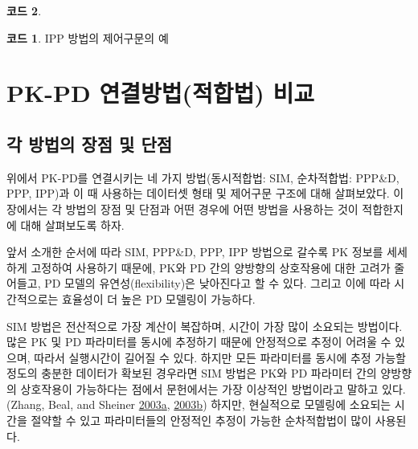 \documentclass[
  10pt,
  krantz2,
  a4paper]{krantz}
\theoremstyle{definition}
\theoremstyle{definition}
\newtheorem{example}{코드}[chapter]
\theoremstyle{definition}
\theoremstyle{remark}
\begin{document}
\begin{example}
\begin{example}

\protect\hypertarget{exm:ipp-control-stream}{}{\label{exm:ipp-control-stream} }IPP 방법의 제어구문의 예

\end{example}
\end{example}

\hypertarget{pk-pd-uxc5f0uxacb0uxbc29uxbc95uxc801uxd569uxbc95-uxbe44uxad50}{%
\section{PK-PD 연결방법(적합법) 비교}\label{pk-pd-uxc5f0uxacb0uxbc29uxbc95uxc801uxd569uxbc95-uxbe44uxad50}}

\hypertarget{uxac01-uxbc29uxbc95uxc758-uxc7a5uxc810-uxbc0f-uxb2e8uxc810}{%
\subsection{각 방법의 장점 및 단점}\label{uxac01-uxbc29uxbc95uxc758-uxc7a5uxc810-uxbc0f-uxb2e8uxc810}}

위에서 PK-PD를 연결시키는 네 가지 방법(동시적합법: SIM, 순차적합법: PPP\&D, PPP, IPP)과 이 때 사용하는 데이터셋 형태 및 제어구문 구조에 대해 살펴보았다. 이 장에서는 각 방법의 장점 및 단점과 어떤 경우에 어떤 방법을 사용하는 것이 적합한지에 대해 살펴보도록 하자.

앞서 소개한 순서에 따라 SIM, PPP\&D, PPP, IPP 방법으로 갈수록 PK 정보를 세세하게 고정하여 사용하기 때문에, PK와 PD 간의 양방향의 상호작용에 대한 고려가 줄어들고, PD 모델의 유연성(flexibility)은 낮아진다고 할 수 있다. 그리고 이에 따라 시간적으로는 효율성이 더 높은 PD 모델링이 가능하다.

SIM 방법은 전산적으로 가장 계산이 복잡하며, 시간이 가장 많이 소요되는 방법이다. 많은 PK 및 PD 파라미터를 동시에 추정하기 때문에 안정적으로 추정이 어려울 수 있으며, 따라서 실행시간이 길어질 수 있다. 하지만 모든 파라미터를 동시에 추정 가능할 정도의 충분한 데이터가 확보된 경우라면 SIM 방법은 PK와 PD 파라미터 간의 양방향의 상호작용이 가능하다는 점에서 문헌에서는 가장 이상적인 방법이라고 말하고 있다. (Zhang, Beal, and Sheiner \protect\hyperlink{ref-zhang1}{2003}\protect\hyperlink{ref-zhang1}{a}, \protect\hyperlink{ref-zhang2}{2003}\protect\hyperlink{ref-zhang2}{b}) 하지만, 현실적으로 모델링에 소요되는 시간을 절약할 수 있고 파라미터들의 안정적인 추정이 가능한 순차적합법이 많이 사용된다.
\end{document}
